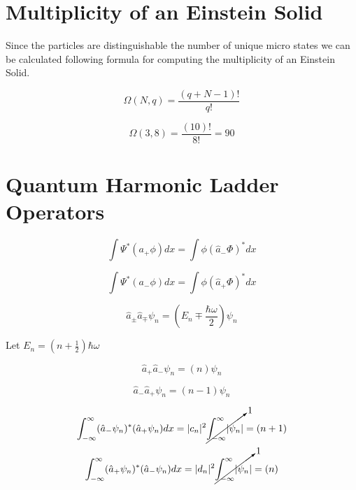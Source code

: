 \documentclass[12pt]{article}
\begin{document}
\maketitle

\section{Multiplicity of an Einstein Solid}

Since the particles are distinguishable the number of unique micro states we can be calculated following formula for computing the multiplicity of an Einstein Solid.

\begin{equation}
  \Omega(N,q)=\frac{(q + N - 1)!}{q!}
\end{equation}

\begin{equation}
  \Omega(3,8)=\frac{(10)!}{8!}=90
\end{equation}

\section{Quantum Harmonic Ladder Operators}

\begin{equation}
  \int\Psi^*(a_+\phi)dx=\int\phi(\hat{a}_-\Phi)^*dx
\end{equation}

\begin{equation}
  \int\Psi^*(a_-\phi)dx=\int\phi(\hat{a}_+\Phi)^*dx
\end{equation}

\begin{equation}
  \hat{a}_\pm\hat{a}_\mp\psi_n=(E_n\mp\frac{\hbar\omega}{2})\psi_n
\end{equation}

Let $E_n=(n+\frac{1}{2})\hbar\omega$

\begin{equation}
  \hat{a}_+\hat{a}_-\psi_n=(n)\psi_n
\end{equation}

\begin{equation}
  \hat{a}_-\hat{a}_+\psi_n=(n-1)\psi_n
\end{equation}

\begin{equation}
  \int_{-\infty}^\infty (\hat{a}_-\psi_n)^*(\hat{a}_+\psi_n)dx=\lvert c_n \rvert^2 \cancelto{1}{\int_{-\infty}^\infty\lvert \psi_{n} \rvert} = (n+1)
\end{equation}
\begin{equation}
  \int_{-\infty}^\infty (\hat{a}_+\psi_n)^*(\hat{a}_-\psi_n)dx=\lvert d_n \rvert^2 \cancelto{1}{\int_{-\infty}^\infty\lvert \psi_{n} \rvert} = (n)
\end{equation}
\end{document}
